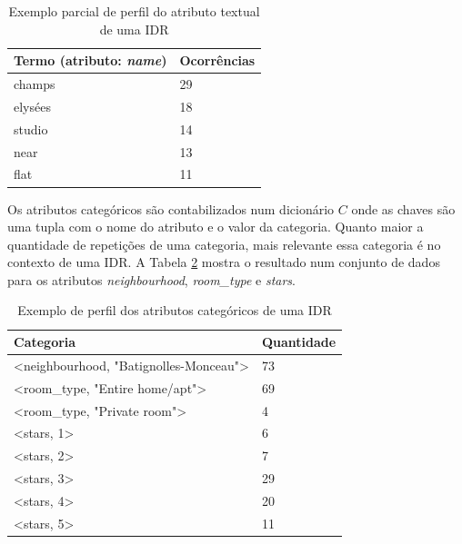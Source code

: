 \begin{table}[!h]
	\caption{Exemplo parcial de perfil do atributo textual de uma IDR}
	\label{table:perfil-textual}
	\centering
	\begin{tabular}{ll}
	\hline
	\textbf{Termo (atributo: {\em name})}     & \textbf{Ocorrências}     \\ \hline
	champs             & 29                       \\ 
	elysées            & 18                       \\ 
	studio             & 14                       \\ 
	near               & 13                       \\ 
	flat               & 11                       \\ \hline
	\end{tabular}
	\mfonte
\end{table}

Os atributos categóricos são contabilizados num dicionário $C$ onde as chaves são uma tupla com o nome do atributo e o valor da categoria. Quanto maior a quantidade de repetições de uma categoria, mais relevante essa categoria é no contexto de uma IDR. A Tabela \ref{table:perfil-categoricos} mostra o resultado num conjunto de dados para os atributos {\em neighbourhood}, {\em room\_type} e {\em stars}.

\begin{table}[b]
	\caption{Exemplo de perfil dos atributos categóricos de uma IDR}
	\label{table:perfil-categoricos}
	\centering
	\begin{tabular}{ll}
	\hline
	\textbf{Categoria}                                            & \textbf{Quantidade} \\ \hline
	\textless{}neighbourhood, "Batignolles-Monceau"\textgreater{} & 73                  \\ 
	\textless{}room\_type, "Entire home/apt"\textgreater{}        & 69                  \\ 
	\textless{}room\_type, "Private room"\textgreater{}           & 4                   \\ 
	\textless{}stars, 1\textgreater{}                             & 6                   \\ 
	\textless{}stars, 2\textgreater{}                             & 7                   \\ 
	\textless{}stars, 3\textgreater{}                             & 29                  \\ 
	\textless{}stars, 4\textgreater{}                             & 20                  \\ 
	\textless{}stars, 5\textgreater{}                             & 11                  \\ \hline
	\end{tabular}
	\mfonte
\end{table}

